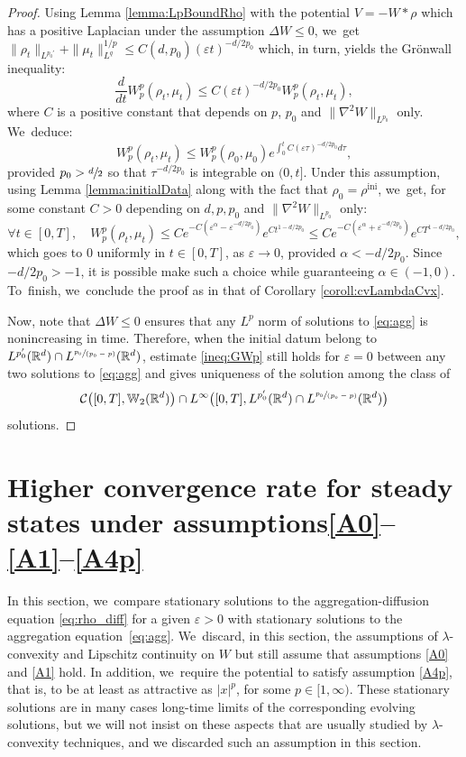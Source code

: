 \documentclass[JEP,XML,SOM,Unicode, NoFloatCountersInSection,published]{cedram}
\let\line\xspace
\newcommand{\spfrac}[2]{\sfrac{#1}{(#2)}}
\newcommand{\ini}{\mathrm{ini}}
\def\RR{\mathbb{R}}
\def\WW{\mathbb{W}}
\def\eps{\varepsilon}
\def\calC{{\mathcal C}}
\theoremstyle{plain}
\theoremstyle{definition}
\begin{document}
\begin{proof}
Using Lemma \ref{lemma:LpBoundRho} with the potential $V = -W*\rho$ which has a positive Laplacian under the assumption $\Delta W \leq 0$, we~get $\|\rho_t\|_{L^{p_0'}} + \|\mu_t\|_{L^q}^{1/p} \leq C(d,p_0)(\eps t)^{-d/2p_0}$ which, in turn, yields the Grönwall inequality:
\[
\frac{d}{dt} W_p^p(\rho_t, \mu_t) \leq C(\eps t)^{-d/2p_0} W_p^p(\rho_t, \mu_t),
\]
where $C$ is a positive constant that depends on $p$, $p_0$ and $\|\nabla^2 W\|_{L^{p_0}}$ only. We~deduce:
\begin{equation*}%
W_p^p(\rho_t, \mu_t) \leq W_p^p(\rho_0, \mu_0) e^{\int_0^t C(\eps \tau)^{-d/2p_0} d\tau},
\end{equation*}
provided $p_0 > \sfrac d2$ so that $\tau^{-d/2p_0}$ is integrable on $(0,t]$. Under this assumption, using Lemma \ref{lemma:initialData} along with the fact that $\rho_0 = \rho^{\ini}$, we~get, for some constant $C>0$ depending on $d, p, p_0$ and $\|\nabla^2 W\|_{L^{p_0}}$ only:
\[
\forall t \in [0,T], \quad W_p^p(\rho_t, \mu_t) \leq C e^{-C(\eps^{\alpha} - \eps^{-d/2p_0})} e^{Ct^{1-d/2p_0}} \leq C e^{-C(\eps^{\alpha} + \eps^{-d/2p_0})} e^{CT^{1-d/2p_0}},
\]
which goes to 0 uniformly in $t \in [0,T]$, as $\eps \to 0$, provided $\alpha < -d/2p_0$. Since $-d/2p_0 > -1$, it is possible make such a choice while guaranteeing $\alpha \in (-1,0)$. To~finish, we~conclude the proof as in that of Corollary \ref{coroll:cvLambdaCvx}.

Now, note that $\Delta W \leq 0$ ensures that any $L^p$ norm of solutions to \eqref{eq:agg} is nonincreasing in time. Therefore, when the initial datum belong to $L^{p_0'}(\RR^d) \cap L^{\spfrac{p_0}{p_0-p}}(\RR^d)$, estimate \eqref{ineq:GWp} still holds for $\eps=0$ between any two solutions to \eqref{eq:agg} and gives uniqueness of the solution among the class of
\[
\calC\bigl([0,T], \WW_2(\RR^d)\bigr) \cap L^\infty\bigl([0,T], L^{p_0'}(\RR^d) \cap L^{\spfrac{p_0}{p_0-p}}(\RR^d)\bigl)
\]
solutions.
\end{proof}

\section{Higher convergence rate for steady states under assumptions\protect\line \texorpdfstring{\protect\eqref{A0}--\protect\eqref{A1}--\protect\eqref{A4p}}{Ap}}\label{section:stationary}

In this section, we~compare stationary solutions to the aggregation-diffusion equation \eqref{eq:rho_diff} for a given $\eps>0$ with stationary solutions to the aggregation equation~\eqref{eq:agg}. We~discard, in this section, the assumptions of $\lambda$-convexity and Lipschitz continuity on $W$ but still assume that assumptions \eqref{A0} and \eqref{A1} hold. In addition, we~require the potential to satisfy assumption \eqref{A4p}, that is, to be at least as attractive as $|x|^p$, for some $p \in [1, \infty)$.
These stationary solutions are in many cases long-time limits of the corresponding evolving solutions, but we will not insist on these aspects that are usually studied by $\lambda$-convexity techniques, and we discarded such an assumption in this section.
\end{document}
